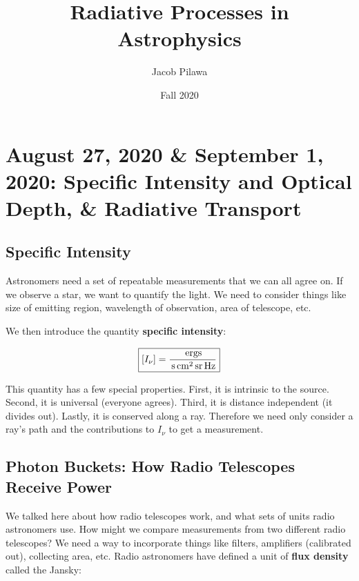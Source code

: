 \documentclass{article}
\title{Radiative Processes in Astrophysics}
\author{Jacob Pilawa}
\date{Fall 2020}
\newcommand{\unit}[1]{{\,\rm #1}}
\begin{document}
\maketitle


\tableofcontents



\newpage
\section{August 27, 2020 \& September 1, 2020: Specific Intensity and Optical Depth, \& Radiative Transport}

\subsection{Specific Intensity}

Astronomers need a set of repeatable measurements that we can all agree on. If we observe a star, we want to quantify the light. We need to consider things like size of emitting region, wavelength of observation, area of telescope, etc.

We then introduce the quantity \textbf{specific intensity}:

\begin{equation}
    \boxed{[I_\nu] = \frac{\unit{ergs}}{\unit{s} \unit{cm}^2 \unit{sr} \unit{Hz}}}
\end{equation}

This quantity has a few special properties. First, it is intrinsic to the source. Second, it is universal (everyone agrees). Third, it is distance independent (it divides out). Lastly, it is conserved along a ray. Therefore we need only consider a ray's path and the contributions to $I_\nu$ to get a measurement. \\

\subsection{Photon Buckets: How Radio Telescopes Receive Power}

We talked here about how radio telescopes work, and what sets of units radio astronomers use. How might we compare measurements from two different radio telescopes? We need a way to incorporate things like filters, amplifiers (calibrated out), collecting area, etc. Radio astronomers have defined a unit of \textbf{flux density} called the Jansky:
\end{document}

